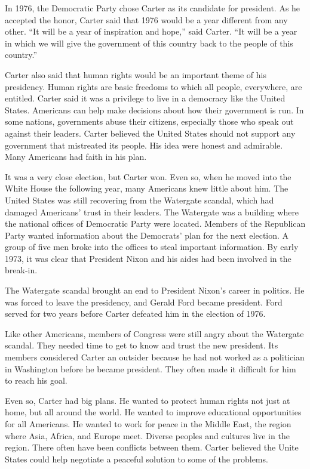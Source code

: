 \documentclass{article}
\begin{document}
In 1976, the Democratic Party chose Carter as its candidate for president. As he accepted the honor, Carter said that 1976 would be a year different from any other.  ``It will be a year of inspiration and hope,'' said Carter. ``It will be a year in which we will give the government of this country back to the people of this country.''

Carter also said that human rights would be an important theme of his presidency. Human rights are basic freedoms to which all people, everywhere, are entitled. Carter said it was a privilege to live in a democracy like the United States. Americans can help make decisions about how their government is run. In some nations, governments abuse their citizens, especially those who speak out against their leaders. Carter believed the United States should not support any government that mistreated its people. His idea were honest and admirable. Many Americans had faith in his plan.

It was a very close election, but Carter won. Even so, when he moved into the White House the following year, many Americans knew little about him. The United States was still recovering from the Watergate scandal, which had damaged Americans' trust in their leaders. The Watergate was a building where the national offices of Democratic Party were located. Members of the Republican Party wanted information about the Democrats' plan for the next election. A group of five men broke into the offices to steal important information. By early 1973, it was clear that President Nixon and his aides had been involved in the break-in.

The Watergate scandal brought an end to President Nixon's career in politics. He was forced to leave the presidency, and Gerald Ford became president. Ford served for two years before Carter defeated him in the election of 1976.

Like other Americans, members of Congress were still angry about the Watergate scandal. They needed time to get to know and trust the new president. Its members considered Carter an outsider because he had not worked as a politician in Washington before he became president. They often made it difficult for him to reach his goal.

Even so, Carter had big plans. He wanted to protect human rights not just at home, but all around the world. He wanted to improve educational opportunities for all Americans. He wanted to work for peace in the Middle East, the region where Asia, Africa, and Europe meet. Diverse peoples and cultures live in the region. There often have been conflicts between them. Carter believed the Unite States could help negotiate a peaceful solution to some of the problems.
\end{document}
